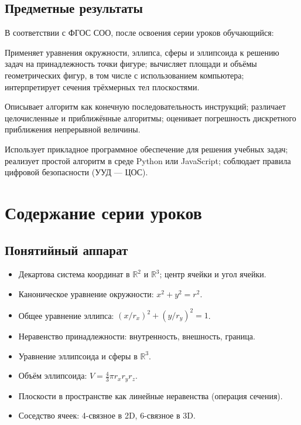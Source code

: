 \documentclass[12pt,a4paper]{scrartcl}
\begin{document}
\subsection{Предметные результаты}

В соответствии с ФГОС СОО, после освоения серии уроков обучающийся:

\begin{rezultat}
Применяет уравнения окружности, эллипса, сферы и эллипсоида к решению задач на принадлежность точки фигуре; вычисляет площади и объёмы геометрических фигур, в том числе с использованием компьютера; интерпретирует сечения трёхмерных тел плоскостями.
\end{rezultat}

\begin{rezultat}
Описывает алгоритм как конечную последовательность инструкций; различает целочисленные и приближённые алгоритмы; оценивает погрешность дискретного приближения непрерывной величины.
\end{rezultat}

\begin{rezultat}
Использует прикладное программное обеспечение для решения учебных задач; реализует простой алгоритм в среде Python или JavaScript; соблюдает правила цифровой безопасности (УУД --- ЦОС).
\end{rezultat}

\section{Содержание серии уроков}

\subsection{Понятийный аппарат}
\begin{itemize}[leftmargin=1.3em,itemsep=0.15em,topsep=0.3em]
  \item Декартова система координат в $\mathbb{R}^2$ и $\mathbb{R}^3$; центр ячейки и угол ячейки.
  \item Каноническое уравнение окружности: $x^2 + y^2 = r^2$.
  \item Общее уравнение эллипса: $\left(x/r_x\right)^2 + \left(y/r_y\right)^2 = 1$.
  \item Неравенство принадлежности: внутренность, внешность, граница.
  \item Уравнение эллипсоида и сферы в $\mathbb{R}^3$.
  \item Объём эллипсоида: $V = \tfrac{4}{3}\pi r_x r_y r_z$.
  \item Плоскости в пространстве как линейные неравенства (операция сечения).
  \item Соседство ячеек: 4-связное в 2D, 6-связное в 3D.
\end{itemize}
\end{document}
